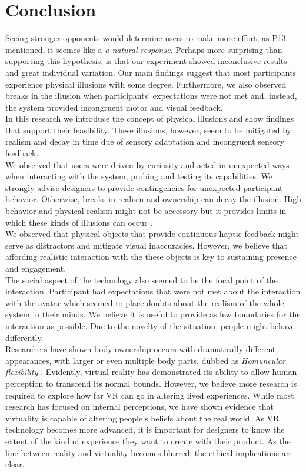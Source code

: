 \section{Conclusion}
Seeing stronger opponents would determine users to make more effort, as P13 mentioned, it seemes like a \textit{a natural response}. Perhaps more surprising than supporting this hypothesis, is that our experiment showed inconclusive results and great individual variation. Our main findings suggest that most participants experience physical illusions with some degree. Furthermore, we also observed breaks in the illusion when participants' expectations were not met and, instead, the system provided incongruent motor and visual feedback.
\\
In this research we introduce the concept of physical illusions and show findings that support their feasibility. These illusions, however, seem to be mitigated by realism and decay in time due of sensory adaptation and incongruent sensory feedback. 
\\
We observed that users were driven by curiosity and acted in unexpected ways when interacting with the system, probing and testing its capabilities. We strongly advise designers to provide contingencies for unexpected participant behavior. Otherwise, breaks in realism and ownership can decay the illusion. High behavior and physical realism might not be accessory but it provides limits in which these kinds of illusions can occur \cite{slater2009place}. \\
We observed that physical objects that provide continuous haptic feedback might serve as distractors and mitigate visual inaccuracies. However, we believe that affording realistic interaction with the these objects is key to sustaining presence and engagement.\\
The social aspect of the technology also seemed to be the focal point of the interaction. Participant had expectations that were not met about the interaction with the avatar which seemed to place doubts about the realism of the whole system in their minds. We believe it is useful to provide as few boundaries for the interaction as possible. Due to the novelty of the situation, people might behave differently. \\
Researchers have shown body ownership occurs with dramatically different appearances, with larger or even multiple body parts, dubbed as \textit{Homuncular flexibility} \cite{normand2011multisensory, won2015homuncular}. Evidently, virtual reality has demonstrated its ability to allow human perception to transcend its normal bounds. However, we believe more research is required to explore how far VR can go in altering lived experiences. While most research has focused on internal perceptions, we have shown evidence that virtuality is capable of altering people's beliefs about the real world. As VR technology becomes more advanced, it is important for designers to know the extent of the kind of experience they want to create with their product. As the line between reality and virtuality becomes blurred, the ethical implications are clear.